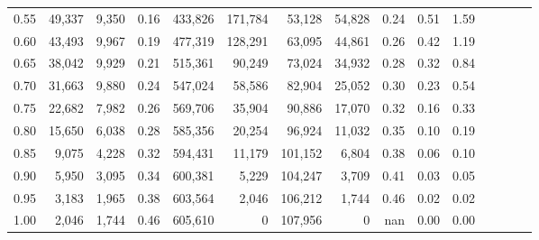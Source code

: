 \begin{tabular}{rrrcrrrrrrrrrrr}
0.55 &  49,337 &  9,350 &                                       0.16 &  433,826 &  171,784 &   53,128 &   54,828 &  0.24 &  0.51 &                         1.59 \\
0.60 &  43,493 &  9,967 &                                       0.19 &  477,319 &  128,291 &   63,095 &   44,861 &  0.26 &  0.42 &                         1.19 \\
0.65 &  38,042 &  9,929 &                                       0.21 &  515,361 &   90,249 &   73,024 &   34,932 &  0.28 &  0.32 &                         0.84 \\
0.70 &  31,663 &  9,880 &                                       0.24 &  547,024 &   58,586 &   82,904 &   25,052 &  0.30 &  0.23 &                         0.54 \\
0.75 &  22,682 &  7,982 &                                       0.26 &  569,706 &   35,904 &   90,886 &   17,070 &  0.32 &  0.16 &                         0.33 \\
0.80 &  15,650 &  6,038 &                                       0.28 &  585,356 &   20,254 &   96,924 &   11,032 &  0.35 &  0.10 &                         0.19 \\
0.85 &   9,075 &  4,228 &                                       0.32 &  594,431 &   11,179 &  101,152 &    6,804 &  0.38 &  0.06 &                         0.10 \\
0.90 &   5,950 &  3,095 &                                       0.34 &  600,381 &    5,229 &  104,247 &    3,709 &  0.41 &  0.03 &                         0.05 \\
0.95 &   3,183 &  1,965 &                                       0.38 &  603,564 &    2,046 &  106,212 &    1,744 &  0.46 &  0.02 &                         0.02 \\
1.00 &   2,046 &  1,744 &                                       0.46 &  605,610 &        0 &  107,956 &        0 &   nan &  0.00 &                         0.00 \\
\bottomrule
\end{tabular}
